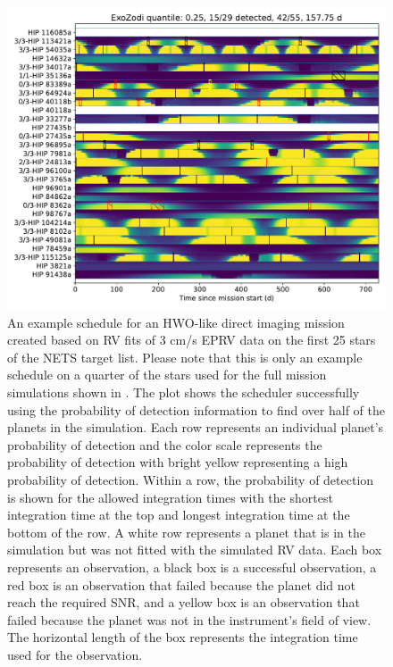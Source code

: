 \begin{figure}
  \begin{center}
    \includegraphics[width=1\textwidth]{ch4/figures/full_schedule_3.pdf}
  \end{center}
  \caption{
    An example schedule for an HWO-like direct imaging mission created based on
    RV fits of 3 cm/s EPRV data on the first 25 stars of the NETS target list.
    Please note that this is only an example schedule on a quarter of the stars
    used for the full mission simulations shown in .
    The plot shows the scheduler successfully using the probability of
    detection information to find over half of the planets in the simulation.
    Each row represents an individual planet's probability of detection and the
    color scale represents the probability of detection with bright yellow
    representing a high probability of detection. Within a row, the probability
    of detection is shown for the allowed integration times with the shortest
    integration time at the top and longest integration time at the bottom of
    the row. A white row represents a planet that is in the simulation but was
    not fitted with the simulated RV data. Each box represents an observation,
    a black box is a successful observation, a red box is an observation that
    failed because the planet did not reach the required SNR, and a yellow box
    is an observation that failed because the planet was not in the
    instrument's field of view. The horizontal length of the box represents the
    integration time used for the observation.
  }
  \label{fig:schedule}
\end{figure}

